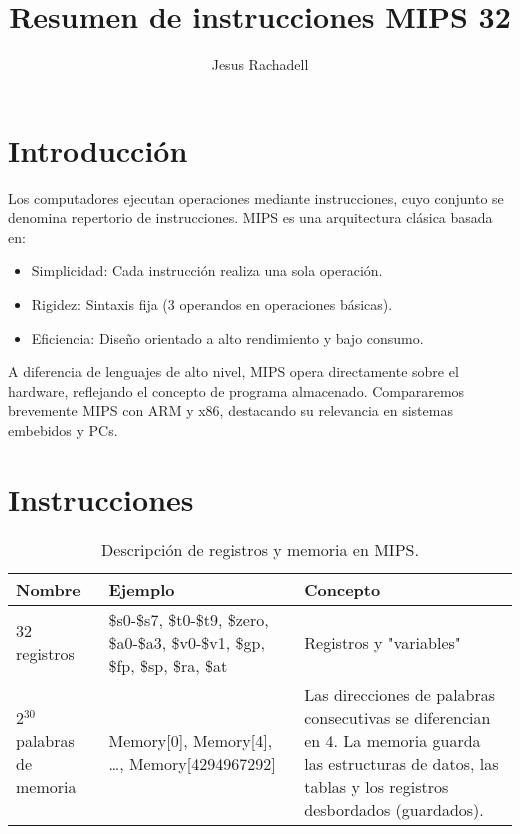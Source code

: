 \documentclass{article}
\title{Resumen de instrucciones MIPS 32}
\author{Jesus Rachadell}
\begin{document}
\maketitle

\section{Introducción}
Los computadores ejecutan operaciones mediante instrucciones, cuyo conjunto se denomina repertorio de instrucciones. MIPS es una arquitectura clásica basada en:
\begin{itemize}
    \item Simplicidad: Cada instrucción realiza una sola operación.
    \item Rigidez: Sintaxis fija (3 operandos en operaciones básicas).
    \item Eficiencia: Diseño orientado a alto rendimiento y bajo consumo.
\end{itemize}
A diferencia de lenguajes de alto nivel, MIPS opera directamente sobre el hardware, reflejando el concepto de programa almacenado. Compararemos brevemente MIPS con ARM y x86, destacando su relevancia en sistemas embebidos y PCs.

\section{Instrucciones}
\begin{table}[h]
\centering
\begin{tabular}{|p{3cm}|p{4cm}|p{7cm}|}
  \hline
  \textbf{Nombre} & \textbf{Ejemplo} & \textbf{Concepto} \\
  \hline
  32 registros & \$s0-\$s7, \$t0-\$t9, \$zero, \$a0-\$a3, \$v0-\$v1, \$gp, \$fp, \$sp, \$ra, \$at & Registros y "variables"\\
  \hline
  2$^{30}$ palabras de memoria & Memory[0], Memory[4], \ldots, Memory[4294967292] & Las direcciones de palabras consecutivas se diferencian en 4. La memoria guarda las estructuras de datos, las tablas y los registros desbordados (guardados). \\
  \hline
\end{tabular}
\caption{Descripción de registros y memoria en MIPS.}
\label{tab:mips}
\end{table}
\end{document}
